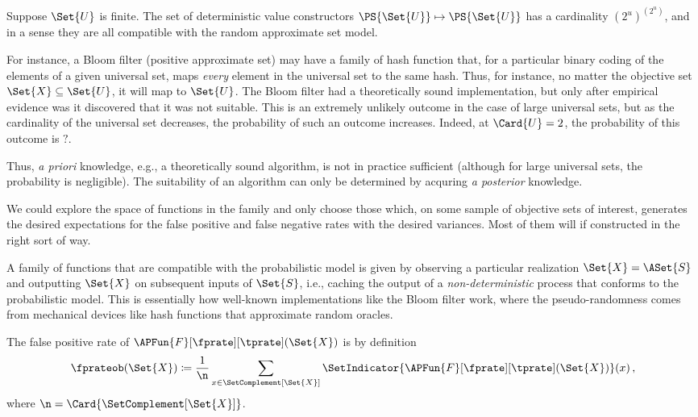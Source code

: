 \documentclass[ ../main.tex]{subfiles}
\newcommand{\ctor}[2]{\APFun{F}[#1][#2]}
\begin{document}
Suppose $\Set{U}$ is finite. The set of deterministic value constructors $\PS{\Set{U}} \mapsto \PS{\Set{U}}$ has a cardinality $(2^u)^(2^u)$, and in a sense they are all compatible with the random approximate set model.

For instance, a Bloom filter (positive approximate set) may have a family of hash function that, for a particular binary coding of the elements of a given universal set, maps \emph{every} element in the universal set to the same hash.
Thus, for instance, no matter the objective set $\Set{X} \subseteq \Set{U}$, it will map to $\Set{U}$.
The Bloom filter had a theoretically sound implementation, but only after empirical evidence was it discovered that it was not suitable.
This is an extremely unlikely outcome in the case of large universal sets, but as the cardinality of the universal set decreases, the probability of such an outcome increases.
Indeed, at $\Card{U} = 2$, the probability of this outcome is $?$.

Thus, \emph{a priori} knowledge, e.g., a theoretically sound algorithm, is not in practice sufficient (although for large universal sets, the probability is negligible).
The suitability of an algorithm can only be determined by acquring \emph{a posterior} knowledge.

We could explore the space of functions in the family and only choose those which, on some sample of objective sets of interest, generates the desired expectations for the false positive and false negative rates with the desired variances.
Most of them will if constructed in the right sort of way.

A family of functions that are compatible with the probabilistic model is given by observing a particular realization $\Set{X} = \ASet{S}$ and outputting 
$\Set{X}$ on subsequent inputs of $\Set{S}$, i.e., caching the output of a \emph{non-deterministic} process that conforms to the probabilistic model.
This is essentially how well-known implementations like the Bloom filter work, where the pseudo-randomness comes from mechanical devices like hash functions that approximate random oracles.

The false positive rate of $\ctor{\fprate}{\tprate}(\Set{X})$ is by definition
\begin{equation}
    \fprateob(\Set{X}) \coloneqq \frac{1}{\n} \sum_{x \in \SetComplement[\Set{X}]} \SetIndicator{\ctor{\fprate}{\tprate}(\Set{X})}(x)\,,
\end{equation}
where $\n = \Card{\SetComplement[\Set{X}]}$.
\end{document}
